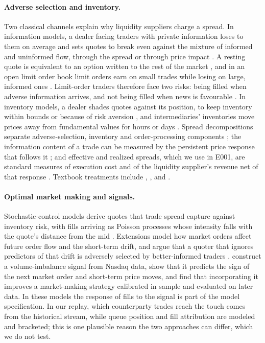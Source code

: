 \documentclass[11pt]{article}
\makeatletter
\renewcommand\section{\@startsection{section}{1}{\z@}{-3.25ex\@plus -1ex \@minus -.2ex}{1.5ex \@plus .2ex}{\normalfont\large\bfseries}}
\makeatother
\begin{document}
\section{Related literature}\label{sec:lit}

\paragraph{Adverse selection and inventory.} Two classical channels explain why liquidity suppliers charge a spread.
In information models, a dealer facing traders with private information loses to them on average and sets quotes to
break even against the mixture of informed and uninformed flow, through the spread \citep{glosten1985} or through price
impact \citep{kyle1985}. A resting quote is
equivalent to an option written to the rest of the market \citep{copeland1983}, and in an open limit order book limit
orders earn on small trades while losing on large, informed ones \citep{glosten1994}. Limit-order traders therefore
face two risks: being filled when adverse information arrives, and not being filled when news is favourable
\citep{handa1996}. In inventory models, a dealer shades quotes against its position, to keep inventory within bounds
\citep{amihud1980} or because of risk aversion \citep{ho1981}, and intermediaries' inventories move prices away from fundamental values for hours or days
\citep{hendershott2014}. Spread decompositions separate adverse-selection, inventory and order-processing components
\citep{glosten1988,huang1997}; the information content of a trade can be measured by the persistent price response
that follows it \citep{hasbrouck1991}; and effective and realized spreads, which we use in E001, are standard measures
of execution cost and of the liquidity supplier's revenue net of that response \citep{bessembinder1997}. Textbook
treatments include \citet{ohara1995}, \citet{harris2003}, \citet{hasbrouck2007} and \citet{foucault2013}.

\paragraph{Optimal market making and signals.} Stochastic-control models derive quotes that trade spread capture against
inventory risk, with fills arriving as Poisson processes whose intensity falls with the quote's distance from the mid
\citep{avellaneda2008,gueant2013,cartea2015}. Extensions model how market orders affect future order flow and the
short-term drift, and argue that a quoter that ignores predictors of that drift is adversely selected by better-informed
traders \citep{cartea2014}. \citet{cartea2018} construct a volume-imbalance signal from Nasdaq data, show that it predicts
the sign of the next market order and short-term price moves, and find that incorporating it improves a market-making
strategy calibrated in sample and evaluated on later data. In these models the response of fills to the signal is part
of the model specification. In our replay, which counterparty trades reach the touch comes from the historical stream,
while queue position and fill attribution are modeled and bracketed; this is one plausible reason the two approaches can
differ, which we do not test.
\end{document}
